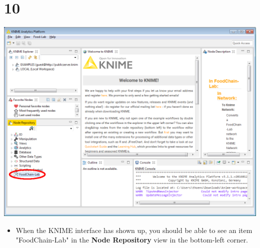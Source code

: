 \documentclass{beamer}
\begin{document}
\section{10}
\begin{frame}
	\begin{center}
  		\includegraphics[height=0.6\textheight]{10.png}
	\end{center}
	\begin{itemize}
		\item When the KNIME interface has shown up, you should be able to see an item "FoodChain-Lab" in the \textbf{Node Repository} view in the bottom-left corner.
	\end{itemize}
\end{frame}
\end{document}
